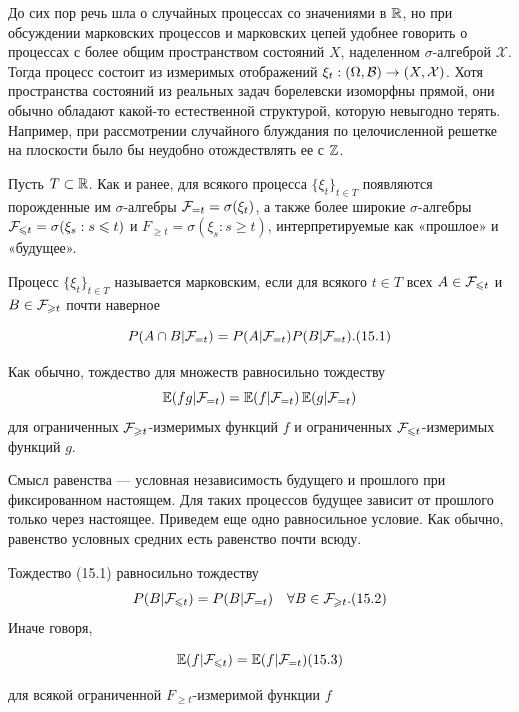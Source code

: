 До сих пор речь шла о случайных процессах со значениями в $\mathbb{R}$,
но при обсуждении марковских процессов и марковских цепей удобнее говорить о процессах с более общим пространством состояний $X$, наделенном $\sigma$-алгеброй $\mathcal{X}$. Тогда процесс состоит из измеримых отображений $\xi_t: (\Omega, \mathcal{B}) \to (X, \mathcal{X})$. Хотя пространства состояний из реальных задач борелевски изоморфны прямой, они обычно обладают какой-то естественной структурой, которую невыгодно терять. Например, при
рассмотрении случайного блуждания по целочисленной решетке на
плоскости было бы неудобно отождествлять ее с $\mathbb{Z}$.

Пусть $T \subset \mathbb{R}$.
Как и ранее, для всякого процесса $\{\xi_t\}_{t \in T}$ появляются порожденные им $\sigma$-алгебры $\mathcal{F}_{=t} = \sigma(\xi_t)$, а также более широкие $\sigma$-алгебры
$\mathcal{F}_{\leqslant t} = \sigma(\xi_s : s \leqslant t)$ и $F_{\geq t} = \sigma(\xi_s : s \geq t)$, интерпретируемые как «прошлое» и «будущее».

\begin{definition}
    Процесс $\{\xi_t\}_{t \in T}$ называется марковским, если для всякого $t \in T$ всех $A \in \mathcal{F}_{\leqslant t}$ и $B \in \mathcal{F}_{\geqslant t}$ почти наверное 
    
    \[ P(A \cap B|\mathcal{F}_{=t}) = P(A|\mathcal{F}_{=t})P(B|\mathcal{F}_{=t}). (15.1) \]
    
    Как обычно, тождество для множеств равносильно тождеству
    \[ \operatorname{\mathbb{E}}(fg|\mathcal{F}_{=t}) = \operatorname{\mathbb{E}}(f|\mathcal{F}_{=t})\operatorname{\mathbb{E}}(g|\mathcal{F}_{=t}) \]
    для ограниченных $\mathcal{F}_{\geqslant t}$-измеримых функций $f$ и ограниченных $\mathcal{F}_{\leqslant t}$-измеримых функций $g$.
\end{definition}

Смысл равенства — условная независимость будущего и прошлого при фиксированном настоящем. Для таких процессов будущее зависит от прошлого только через настоящее. Приведем еще одно равносильное условие. Как обычно, равенство условных средних есть равенство почти всюду.

\begin{lemma}
    Тождество (15.1) равносильно тождеству
    \[ P(B|\mathcal{F}_{\leqslant t}) = P(B|\mathcal{F}_{=t}) \quad \forall B \in \mathcal{F}_{\geqslant t}. (15.2) \]
    Иначе говоря,
    
    \[ \operatorname{\mathbb{E}}(f|\mathcal{F}_{\leqslant t}) = \operatorname{\mathbb{E}}(f|\mathcal{F}_{=t}) (15.3) \]
    
    для всякой ограниченной $F_{\geq t}$-измеримой функции $f$
\end{lemma}

